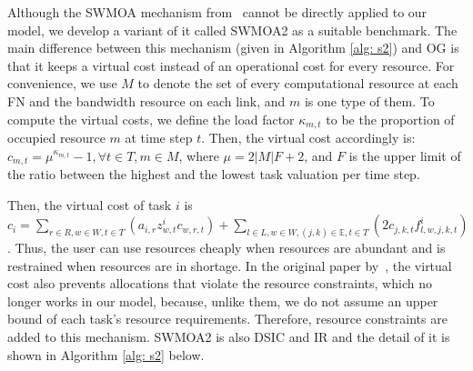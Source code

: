 \documentclass[11pt]{phdthesis}
\begin{document}
Although the SWMOA mechanism from~\cite{shi2017online} cannot be directly applied to our model, we develop a variant of it called SWMOA2 as a suitable benchmark. The main difference between this mechanism (given in Algorithm \ref{alg: s2}) and OG is that it keeps a virtual cost instead of an operational cost for every resource. For convenience, we use $ M $ to denote the set of every computational resource at each FN and the bandwidth resource on each link, and $m$ is one type of them. To compute the virtual costs, we define the load factor $\kappa_{m,t}$ to be the proportion of occupied resource $m$ at time step $t$. Then, the virtual cost accordingly is: $ c_{m,t} = \mu ^{\kappa_{m,t}} - 1, \forall t \in T, m \in M $, where $\mu = 2|M|F + 2$, and $F $ is the upper limit of the ratio between the highest and the lowest task valuation per time step.

Then, the virtual cost of task $ i $ is $ c_i = \sum_{r \in R,w \in W, t\in T} (a_{i,r} z_{w,t}^i c_{w,r,t}) + \sum_{l \in L,w \in W,(j,k) \in \mathbb{E}, t\in T} (2  c_{j,k,t}  f_{l,w, j,k,t}^i) $. Thus, the user can use resources cheaply when resources are abundant and is restrained when resources are in shortage. In the original paper by~\cite{shi2017online}, the virtual cost also prevents allocations that violate the resource constraints, which no longer works in our model, because, unlike them, we do not assume an upper bound of each task's resource requirements. Therefore, resource constraints are added to this mechanism. SWMOA2 is also DSIC and IR and the detail of it is shown in Algorithm \ref{alg: s2} below. 
\end{document}
